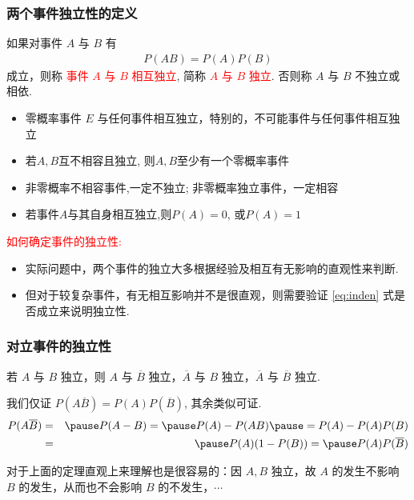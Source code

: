 \begin{frame}
  \frametitle{两个事件独立性的定义}
  \begin{defi}
    如果对事件 $A$ 与 $B$ 有
    \begin{eqnarray*}
      P(AB)=P(A)P(B)
    \end{eqnarray*}
    成立，则称 \textcolor{red}{事件 $A$ 与 $B$ 相互独立}, 简称 \textcolor{red}{$A$ 与 $B$ 独立}. 否则称 $A$ 与 $B$ 不独立或相依.
  \end{defi}

\begin{rmk}
	\begin{itemize}
		\item 零概率事件 $E$ 与任何事件相互独立，特别的，不可能事件与任何事件相互独立
		\item 若$A, B$互不相容且独立, 则$A, B$至少有一个零概率事件
        \item 非零概率不相容事件,一定不独立; 非零概率独立事件，一定相容
        \item 若事件$A$与其自身相互独立,则$P(A)=0$, 或$P(A)=1$
\end{itemize}


\end{rmk}

\pause
  \textcolor{red}{如何确定事件的独立性: }
  \begin{itemize}[<+-|alert@+>]
  \item 实际问题中，两个事件的独立大多根据经验及相互有无影响的直观性来判断.
  \item 但对于较复杂事件，有无相互影响并不是很直观，则需要验证 \eqref{eq:inden} 式是否成立来说明独立性.
  \end{itemize}
\end{frame}


 \begin{frame}
	\frametitle{对立事件的独立性}
	\begin{thm}
		若 $A$ 与 $B$ 独立，则 $A$ 与 $\overline{B}$ 独立，$\overline{A}$ 与 $B$ 独立，$\overline{A}$ 与 $\overline{B}$ 独立.
	\end{thm}
	\pause

	\zheng 我们仅证 $P (A\overline{B})=P (A) P (\overline{B})$, 其余类似可证.
	\begin{eqnarray*}
		P(A\overline{B})&=&\pause P(A-B)=\pause P(A)-P(AB)\pause =P(A)-P(A)P(B)\\
		&=&\pause P(A)(1-P(B))=\pause P(A)P(\overline{B})
	\end{eqnarray*}

	\pause
	对于上面的定理直观上来理解也是很容易的：因 $A,B$ 独立，故 $A$ 的发生不影响 $B$ 的发生，从而也不会影响 $B$ 的不发生，$\cdots$
\end{frame}


